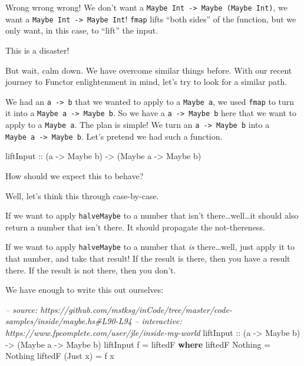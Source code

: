 \documentclass[]{article}
\newenvironment{Shaded}{}{}
\newcommand{\KeywordTok}[1]{\textcolor[rgb]{0.00,0.44,0.13}{\textbf{#1}}}
\newcommand{\DataTypeTok}[1]{\textcolor[rgb]{0.56,0.13,0.00}{#1}}
\newcommand{\CommentTok}[1]{\textcolor[rgb]{0.38,0.63,0.69}{\textit{#1}}}
\newcommand{\OtherTok}[1]{\textcolor[rgb]{0.00,0.44,0.13}{#1}}
\newcommand{\FunctionTok}[1]{\textcolor[rgb]{0.02,0.16,0.49}{#1}}
\newcommand{\NormalTok}[1]{#1}
\begin{document}
Wrong wrong wrong! We don't want a
\texttt{Maybe\ Int\ -\textgreater{}\ Maybe\ (Maybe\ Int)}, we want a
\texttt{Maybe\ Int\ -\textgreater{}\ Maybe\ Int}! \texttt{fmap} lifts ``both
sides'' of the function, but we only want, in this case, to ``lift'' the input.

This is a disaster!

But wait, calm down. We have overcome similar things before. With our recent
journey to Functor enlightenment in mind, let's try to look for a similar path.

We had an \texttt{a\ -\textgreater{}\ b} that we wanted to apply to a
\texttt{Maybe\ a}, we used \texttt{fmap} to turn it into a
\texttt{Maybe\ a\ -\textgreater{}\ Maybe\ b}. So we have a
\texttt{a\ -\textgreater{}\ Maybe\ b} here that we want to apply to a
\texttt{Maybe\ a}. The plan is simple! We turn an
\texttt{a\ -\textgreater{}\ Maybe\ b} into a
\texttt{Maybe\ a\ -\textgreater{}\ Maybe\ b}. Let's pretend we had such a
function.

\begin{Shaded}
\begin{Highlighting}[]
\OtherTok{liftInput ::}\NormalTok{ (a }\OtherTok{->} \DataTypeTok{Maybe}\NormalTok{ b) }\OtherTok{->}\NormalTok{ (}\DataTypeTok{Maybe}\NormalTok{ a }\OtherTok{->} \DataTypeTok{Maybe}\NormalTok{ b)}
\end{Highlighting}
\end{Shaded}

How should we expect this to behave?

Well, let's think this through case-by-case.

If we want to apply \texttt{halveMaybe} to a number that isn't
there\ldots{}well\ldots{}it should also return a number that isn't there. It
should propagate the not-thereness.

If we want to apply \texttt{halveMaybe} to a number that \emph{is}
there\ldots{}well, just apply it to that number, and take that result! If the
result is there, then you have a result there. If the result is not there, then
you don't.

We have enough to write this out ourselves:

\begin{Shaded}
\begin{Highlighting}[]
\CommentTok{-- source: https://github.com/mstksg/inCode/tree/master/code-samples/inside/maybe.hs#L90-L94}
\CommentTok{-- interactive: https://www.fpcomplete.com/user/jle/inside-my-world}
\OtherTok{liftInput ::}\NormalTok{ (a }\OtherTok{->} \DataTypeTok{Maybe}\NormalTok{ b) }\OtherTok{->}\NormalTok{ (}\DataTypeTok{Maybe}\NormalTok{ a }\OtherTok{->} \DataTypeTok{Maybe}\NormalTok{ b)}
\NormalTok{liftInput f }\FunctionTok{=}\NormalTok{ liftedF}
  \KeywordTok{where}
\NormalTok{    liftedF }\DataTypeTok{Nothing}  \FunctionTok{=} \DataTypeTok{Nothing}
\NormalTok{    liftedF (}\DataTypeTok{Just}\NormalTok{ x) }\FunctionTok{=}\NormalTok{ f x}
\end{Highlighting}
\end{Shaded}
\end{document}

